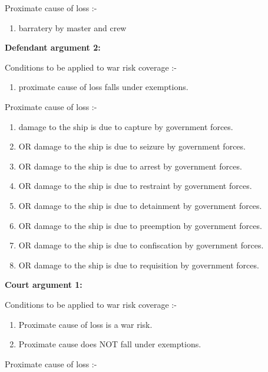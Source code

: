      Proximate cause of loss :- 
     
     \begin{enumerate}
         \item barratery by master and crew
     \end{enumerate}
    
                
     \textbf{Defendant argument 2:}
     
     Conditions to be applied to war risk coverage :-
     
     \begin{enumerate}
         \item proximate cause of loss falls under exemptions.
     \end{enumerate}
                
     
     Proximate cause of loss :-
     
     \begin{enumerate}
        \item damage to the ship is due to capture by government forces.
        \item OR damage to the ship is due to seizure by government forces.
        \item OR damage to the ship is due to arrest by government forces.
        \item OR damage to the ship is due to restraint by government forces.
        \item OR damage to the ship is due to detainment by government forces.
        \item OR damage to the ship is due to preemption by government forces.
        \item OR damage to the ship is due to confiscation by government forces.
        \item OR damage to the ship is due to requisition by government forces.
     \end{enumerate}
                
     \textbf{Court argument 1:}
     
     Conditions to be applied to war risk coverage :-
     
     \begin{enumerate}
        \item Proximate cause of loss is a war risk.
        \item Proximate cause does NOT fall under exemptions.
     \end{enumerate}
                
     Proximate cause of loss :-
     

